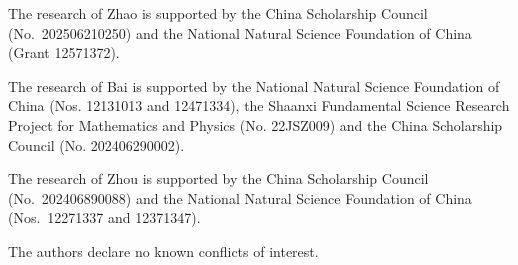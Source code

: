 \documentclass[11pt]{article}
\numberwithin{equation}{section}
\begin{document}
The research of Zhao is supported by the China Scholarship Council (No.~202506210250) and the National Natural Science Foundation of China (Grant 12571372).

The research of Bai is supported by the National Natural Science Foundation of China (Nos. 12131013 and 12471334), the Shaanxi Fundamental Science Research Project for Mathematics and Physics (No. 22JSZ009) and the China Scholarship Council (No. 202406290002).

The research of Zhou is supported by the China Scholarship Council (No.~202406890088) and the National Natural Science Foundation of China (Nos.~12271337 and 12371347).


\bigskip


The authors declare no known conflicts of interest.



\end{document}
